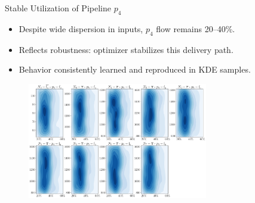\documentclass[hyperref={colorlinks,citecolor=blue,linkcolor=blue,urlcolor=blue}]{beamer}
\begin{document}
\begin{frame}{Stable Utilization of Pipeline $p_4$}
\scriptsize
    \begin{itemize}
        \item Despite wide dispersion in inputs, $p_4$ flow remains 20--40\%.
        \item Reflects robustness: optimizer stabilizes this delivery path.
        \item Behavior consistently learned and reproduced in KDE samples.
    \end{itemize}
    \begin{figure}
        \includegraphics[width=0.7\textwidth]{figures/inputs_outputs_1.png}
    \end{figure}
\end{frame}
\end{document}
